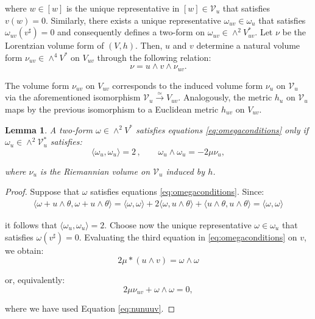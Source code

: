 \documentclass[10pt,a4paper,twoside,reqno]{amsart}
\theoremstyle{plain}
\newtheorem{lemma}[thm]{Lemma}
\theoremstyle{definition}
\theoremstyle{remark}
\def\cV{\mathcal{V}}
\newcommand{\escal}[1]{\langle#1\rangle}
\begin{document}
\noindent
where $w\in [w]$ is the unique representative in $[w] \in \cV_u$ that satisfies $v(w) = 0$. Similarly, there exists a unique representative $\omega_{uv} \in \omega_u$ that satisfies $\omega_{uv}(v^\sharp) = 0$ and consequently defines a two-form on $\omega_{uv} \in \wedge^2 V^{\ast}_{uv} $. Let $\nu$ be the Lorentzian volume form of $(V,h)$. Then, $u$ and $v$ determine a natural volume form $\nu_{uv} \in \wedge^4 V^{\ast}$ on $V_{uv}$ through the following relation:
\begin{equation}
\label{eq:nunuuv}
\nu = u\wedge v \wedge \nu_{uv}.
\end{equation} 

\noindent
The volume form $\nu_{uv}$ on $V_{uv}$ corresponds to the induced volume form $\nu_u$ on $\cV_u$ via the aforementioned isomorphism $\cV_u \xrightarrow{\simeq} V_{uv}$. Analogously, the metric $h_u$ on $\cV_u$ maps by the previous isomorphism to a Euclidean metric $h_{uv}$ on $V_{uv}$.

\begin{lemma}
A two-form $\omega\in \wedge^2 V^{\ast}$ satisfies equations \eqref{eq:omegaconditions} only if $\omega_u \in \wedge^2 \cV_u^{\ast}$ satisfies:
\begin{equation*}
\escal{\omega_u,\omega_u} = 2\, , \qquad \omega_u\wedge\omega_u = -2 \mu \nu_u,
\end{equation*}

\noindent
where $\nu_u$ is the Riemannian volume on $\cV_u$ induced by $h$.
\end{lemma}

\begin{proof}
Suppose that $\omega$ satisfies equations \eqref{eq:omegaconditions}. Since:
\begin{eqnarray*}
\escal{\omega + u \wedge \theta,\omega + u \wedge \theta} = \escal{\omega,\omega} + 2\escal{\omega , u \wedge \theta} + \escal{u\wedge \theta,u\wedge \theta} = \escal{\omega,\omega}
\end{eqnarray*}

\noindent
it follows that $\escal{\omega_u,\omega_u} = 2$. Choose now the unique representative $\omega \in \omega_u$ that satisfies $\omega(v^\sharp) = 0$. Evaluating the third equation in \eqref{eq:omegaconditions} on $v$, we obtain:
\begin{equation*}
2\mu \ast(u\wedge v) = \omega \wedge \omega
\end{equation*}

\noindent
or, equivalently:
\begin{equation*}
2 \mu \nu_{uv} + \omega \wedge \omega = 0,
\end{equation*}

\noindent
where we have used Equation \eqref{eq:nunuuv}.
\end{proof}
\end{document}
